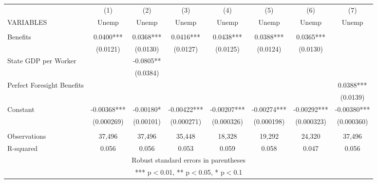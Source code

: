 \documentclass[]{article}
\begin{document}
\begin{tabular}{lccccccc} \hline
 & (1) & (2) & (3) & (4) & (5) & (6) & (7) \\
VARIABLES & Unemp & Unemp & Unemp & Unemp & Unemp & Unemp & Unemp \\ \hline
 &  &  &  &  &  &  &  \\
Benefits & 0.0400*** & 0.0368*** & 0.0416*** & 0.0438*** & 0.0388*** & 0.0365*** &  \\
 & (0.0121) & (0.0130) & (0.0127) & (0.0125) & (0.0124) & (0.0130) &  \\
State GDP per Worker &  & -0.0805** &  &  &  &  &  \\
 &  & (0.0384) &  &  &  &  &  \\
Perfect Foresight Benefits &  &  &  &  &  &  & 0.0388*** \\
 &  &  &  &  &  &  & (0.0139) \\
Constant & -0.00368*** & -0.00180* & -0.00422*** & -0.00207*** & -0.00274*** & -0.00292*** & -0.00380*** \\
 & (0.000269) & (0.00101) & (0.000271) & (0.000326) & (0.000198) & (0.000323) & (0.000360) \\
 &  &  &  &  &  &  &  \\
Observations & 37,496 & 37,496 & 35,448 & 18,328 & 19,292 & 24,320 & 37,496 \\
 R-squared & 0.056 & 0.056 & 0.053 & 0.059 & 0.058 & 0.047 & 0.056 \\ \hline
\multicolumn{8}{c}{ Robust standard errors in parentheses} \\
\multicolumn{8}{c}{ *** p$<$0.01, ** p$<$0.05, * p$<$0.1} \\
\end{tabular}
\end{document}

